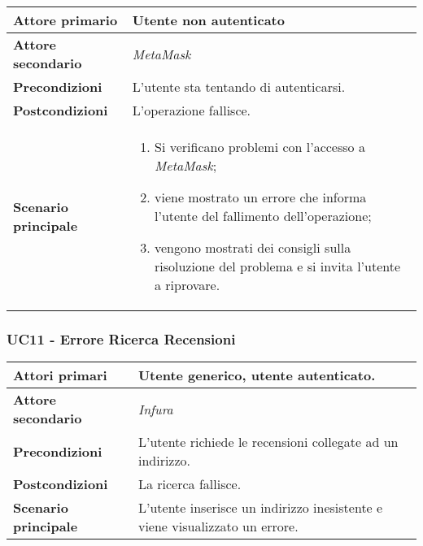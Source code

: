             \begin{center}
                \renewcommand{\arraystretch}{1.5}
                \begin{tabular}{m{10em} m{20em}}
                    \hline
                    \textbf{Attore primario} & Utente non autenticato \\
                    \hline
                    \textbf{Attore secondario} & \textit{MetaMask} \\
                    \hline
                    \textbf{Precondizioni} & L'utente sta tentando di autenticarsi. \\
                    \hline
                    \textbf{Postcondizioni} & L'operazione fallisce. \\
                    \hline
                    \textbf{Scenario principale} &
                        \begin{enumerate}
                            \item Si verificano problemi con l'accesso a \textit{MetaMask};
                            \item viene mostrato un errore che informa l'utente del fallimento dell'operazione;
                            \item vengono mostrati dei consigli sulla risoluzione del problema e si invita
                            l'utente a riprovare.
                        \end{enumerate} \\
                    \hline
                \end{tabular}
            \end{center}

        \subsubsection{UC11 - Errore Ricerca Recensioni}
        \label{UC11}

            \begin{center}
                \renewcommand{\arraystretch}{1.5}
                \begin{tabular}{m{10em} m{20em}}
                    \hline
                    \textbf{Attori primari} & Utente generico, utente autenticato. \\
                    \hline
                    \textbf{Attore secondario} & \textit{Infura} \\
                    \hline
                    \textbf{Precondizioni} & L'utente richiede le recensioni collegate ad un indirizzo. \\
                    \hline
                    \textbf{Postcondizioni} & La ricerca fallisce. \\
                    \hline
                    \textbf{Scenario principale} & L'utente inserisce un indirizzo inesistente e viene visualizzato un errore. \\
                    \hline
                \end{tabular}
            \end{center}

